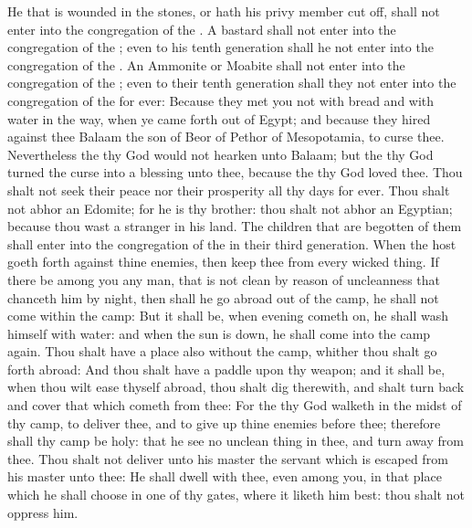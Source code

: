 \begin{biblechapter} %
 He that is wounded in the stones, or hath his privy member cut off, shall not enter into the congregation of the \LORD.
\verse A bastard shall not enter into the congregation of the \LORD; even to his tenth generation shall he not enter into the congregation of the \LORD.
\verse An Ammonite or Moabite shall not enter into the congregation of the \LORD; even to their tenth generation shall they not enter into the congregation of the \LORD for ever:
\verse Because they met you not with bread and with water in the way, when ye came forth out of Egypt; and because they hired against thee Balaam the son of Beor of Pethor of Mesopotamia, to curse thee.
\verse Nevertheless the \LORD thy God would not hearken unto Balaam; but the \LORD thy God turned the curse into a blessing unto thee, because the \LORD thy God loved thee.
\verse Thou shalt not seek their peace nor their prosperity all thy days for ever.
\verse Thou shalt not abhor an Edomite; for he is thy brother: thou shalt not abhor an Egyptian; because thou wast a stranger in his land.
\verse The children that are begotten of them shall enter into the congregation of the \LORD in their third generation.
 When the host goeth forth against thine enemies, then keep thee from every wicked thing.
\verse If there be among you any man, that is not clean by reason of uncleanness that chanceth him by night, then shall he go abroad out of the camp, he shall not come within the camp:
\verse But it shall be, when evening cometh on, he shall wash himself with water: and when the sun is down, he shall come into the camp again.
\verse Thou shalt have a place also without the camp, whither thou shalt go forth abroad:
\verse And thou shalt have a paddle upon thy weapon; and it shall be, when thou wilt ease thyself abroad, thou shalt dig therewith, and shalt turn back and cover that which cometh from thee:
\verse For the \LORD thy God walketh in the midst of thy camp, to deliver thee, and to give up thine enemies before thee; therefore shall thy camp be holy: that he see no unclean thing in thee, and turn away from thee.
\flushcolsend\columnbreak %
 Thou shalt not deliver unto his master the servant which is escaped from his master unto thee:
\verse He shall dwell with thee, even among you, in that place which he shall choose in one of thy gates, where it liketh him best: thou shalt not oppress him.

\end{biblechapter}
